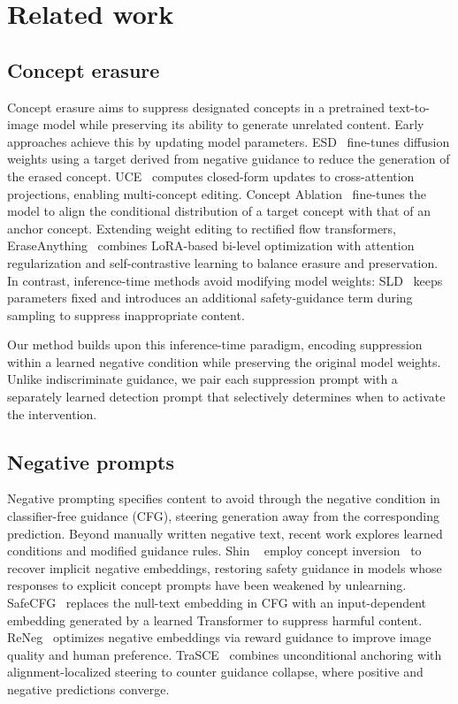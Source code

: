 \section{Related work}
\label{sec:related}

\subsection{Concept erasure}
Concept erasure aims to suppress designated concepts in a pretrained text-to-image model while preserving its ability to generate unrelated content.
Early approaches achieve this by updating model parameters.
ESD~\cite{Gandikota_2023_ICCV} fine-tunes diffusion weights using a target derived from negative guidance to reduce the generation of the erased concept.
UCE~\cite{Gandikota_2024_WACV} computes closed-form updates to cross-attention projections, enabling multi-concept editing.
Concept Ablation~\cite{Kumari_2023_ICCV} fine-tunes the model to align the conditional distribution of a target concept with that of an anchor concept.
Extending weight editing to rectified flow transformers, EraseAnything~\cite{pmlr-v267-gao25j} combines LoRA-based bi-level optimization with attention regularization and self-contrastive learning to balance erasure and preservation.
In contrast, inference-time methods avoid modifying model weights: SLD~\cite{Schramowski_2023_CVPR} keeps parameters fixed and introduces an additional safety-guidance term during sampling to suppress inappropriate content.

Our method builds upon this inference-time paradigm, encoding suppression within a learned negative condition while preserving the original model weights.
Unlike indiscriminate guidance, we pair each suppression prompt with a separately learned detection prompt that selectively determines when to activate the intervention.

\subsection{Negative prompts}
Negative prompting specifies content to avoid through the negative condition in classifier-free guidance (CFG), steering generation away from the corresponding prediction.
Beyond manually written negative text, recent work explores learned conditions and modified guidance rules.
Shin \etal~\cite{shin2025promptbasedsafetyguidanceineffective} employ concept inversion~\cite{pham2023circumventing} to recover implicit negative embeddings, restoring safety guidance in models whose responses to explicit concept prompts have been weakened by unlearning.
SafeCFG~\cite{pan2025safecfg} replaces the null-text embedding in CFG with an input-dependent embedding generated by a learned Transformer to suppress harmful content.
ReNeg~\cite{Li_2025_CVPR_ReNeg} optimizes negative embeddings via reward guidance to improve image quality and human preference.
TraSCE~\cite{jain2026rethinkingnegativepromptingconcept} combines unconditional anchoring with alignment-localized steering to counter guidance collapse, where positive and negative predictions converge.

